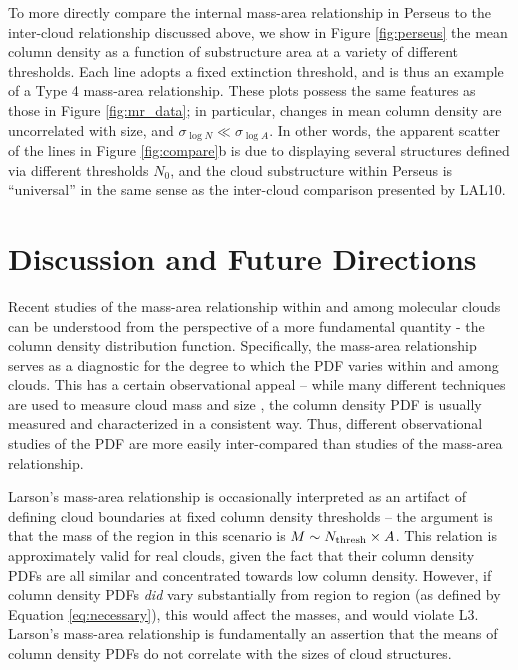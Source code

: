 To more directly compare the internal mass-area relationship in Perseus to the inter-cloud relationship discussed above, we show in Figure \ref{fig:perseus} the mean column density as a function of substructure area at a variety of different thresholds. Each line adopts a fixed extinction threshold, and is thus an example of a Type 4 mass-area relationship. These plots possess the same features as those in Figure \ref{fig:mr_data}; in particular, changes in mean column density are uncorrelated with size, and $\sigma_{\log N} \ll \sigma_{\log A}$. In other words, the apparent scatter of the lines in Figure \ref{fig:compare}b is due to displaying several structures defined via different thresholds $N_0$, and the cloud substructure within Perseus is ``universal'' in the same sense as the inter-cloud comparison presented by LAL10.

\section{Discussion and Future Directions}
Recent studies of the mass-area relationship within and among molecular clouds can be understood from the perspective of a more fundamental quantity - the column density distribution function. Specifically, the mass-area relationship serves as a diagnostic for the degree to which the PDF varies within and among clouds. This has a certain observational appeal -- while many different techniques are used to measure cloud mass and size \citep{Sanchez05, Rosolowsky06, Heyer09, Kauffmann10a, Lombardi10}, the column density PDF is usually measured and characterized in a consistent way. Thus, different observational studies of the PDF are more easily inter-compared than studies of the mass-area relationship.

Larson's mass-area relationship is occasionally interpreted as an artifact of defining cloud boundaries at fixed column density thresholds -- the argument is that the mass of the region in this scenario is $M \sim N_{\rm thresh}\times A$. This relation is approximately valid for real clouds, given the fact that their column density PDFs are all similar and concentrated towards low column density. However, if column density PDFs \textit{did} vary substantially from region to region (as defined by Equation \ref{eq:necessary}), this would affect the masses, and would violate L3. Larson's mass-area relationship is fundamentally an assertion that the means of column density PDFs do not correlate with the sizes of cloud structures.

